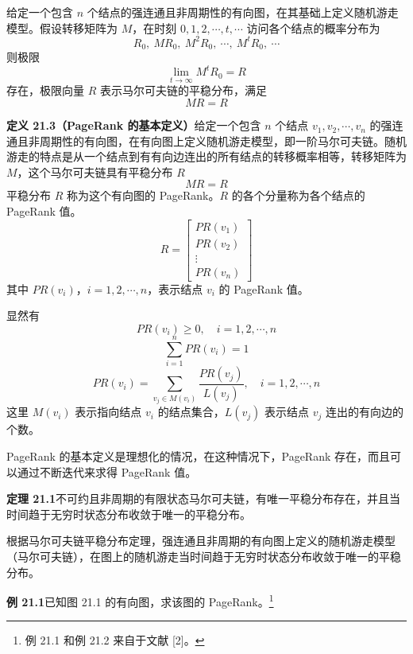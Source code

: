 \documentclass[UTF8, 12pt, fontset=fandol, oneside]{ctexart}
\begin{document}
给定一个包含 $n$ 个结点的强连通且非周期性的有向图，在其基础上定义随机游走模型。假设转移矩阵为 $M$，在时刻 $0,1,2,\cdots,t,\cdots$ 访问各个结点的概率分布为
\[
R_0,\ MR_0,\ M^2R_0,\ \cdots,\ M^tR_0,\ \cdots
\]
则极限
\begin{equation}
\lim_{t\to\infty}M^tR_0=R
\tag{21.5}
\end{equation}
存在，极限向量 $R$ 表示马尔可夫链的平稳分布，满足
\[
MR=R
\]

\noindent\textbf{定义 21.3（PageRank 的基本定义）}\quad 给定一个包含 $n$ 个结点 $v_1,v_2,\cdots,v_n$ 的强连通且非周期性的有向图，在有向图上定义随机游走模型，即一阶马尔可夫链。随机游走的特点是从一个结点到有有向边连出的所有结点的转移概率相等，转移矩阵为 $M$，这个马尔可夫链具有平稳分布 $R$
\begin{equation}
MR=R
\tag{21.6}
\end{equation}
平稳分布 $R$ 称为这个有向图的 PageRank。$R$ 的各个分量称为各个结点的 PageRank 值。
\[
R=
\begin{bmatrix}
PR(v_1)\\
PR(v_2)\\
\vdots\\
PR(v_n)
\end{bmatrix}
\]
其中 $PR(v_i)$，$i=1,2,\cdots,n$，表示结点 $v_i$ 的 PageRank 值。

显然有
\begin{equation}
PR(v_i)\geqslant 0,\quad i=1,2,\cdots,n
\tag{21.7}
\end{equation}
\begin{equation}
\sum_{i=1}^n PR(v_i)=1
\tag{21.8}
\end{equation}
\begin{equation}
PR(v_i)=\sum_{v_j\in M(v_i)}\frac{PR(v_j)}{L(v_j)},\quad i=1,2,\cdots,n
\tag{21.9}
\end{equation}
这里 $M(v_i)$ 表示指向结点 $v_i$ 的结点集合，$L(v_j)$ 表示结点 $v_j$ 连出的有向边的个数。

PageRank 的基本定义是理想化的情况，在这种情况下，PageRank 存在，而且可以通过不断迭代来求得 PageRank 值。

\noindent\textbf{定理 21.1}\quad 不可约且非周期的有限状态马尔可夫链，有唯一平稳分布存在，并且当时间趋于无穷时状态分布收敛于唯一的平稳分布。

根据马尔可夫链平稳分布定理，强连通且非周期的有向图上定义的随机游走模型（马尔可夫链），在图上的随机游走当时间趋于无穷时状态分布收敛于唯一的平稳分布。

\noindent\textbf{例 21.1}\quad 已知图 21.1 的有向图，求该图的 PageRank。\footnote{例 21.1 和例 21.2 来自于文献 [2]。}
\end{document}
